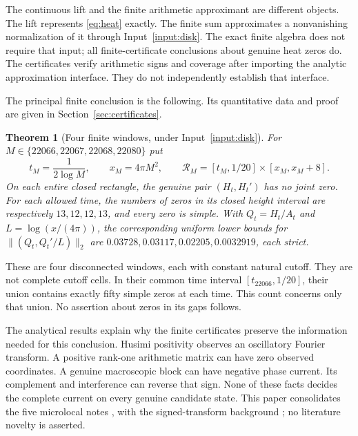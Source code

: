 \documentclass[11pt]{article}
\numberwithin{equation}{section}
\newtheorem{theorem}{Theorem}[section]
\theoremstyle{definition}
\theoremstyle{remark}
\begin{document}
The continuous lift and the finite arithmetic approximant are different
objects. The lift represents \eqref{eq:heat} exactly. The finite sum
approximates a nonvanishing normalization of it through
Input~\ref{input:disk}. The exact finite algebra does not require that
input; all finite-certificate conclusions about genuine heat zeros do. The certificates
verify arithmetic signs and coverage after importing the analytic
approximation interface. They do not independently establish that
interface.

The principal finite conclusion is the following. Its quantitative data
and proof are given in Section~\ref{sec:certificates}.
\begin{theorem}[Four finite windows, under Input~\ref{input:disk}]
\label{thm:main}
For $M\in\{22066,22067,22068,22080\}$ put
\[
 t_M=\frac1{2\log M},\qquad x_M=4\pi M^2,\qquad
 \mathcal R_M=[t_M,1/20]\times[x_M,x_M+8].
\]
On each entire closed rectangle, the genuine pair $(H_t,H_t')$ has no
joint zero. For each allowed time, the numbers of zeros in its closed
height interval are respectively $13,12,12,13$, and every zero is simple.
With $Q_t=H_t/A_t$ and $L=\log(x/(4\pi))$, the corresponding uniform
lower bounds for $\|(Q_t,Q_t'/L)\|_2$ are
$0.03728,0.03117,0.02205,0.0032919$, each strict.
\end{theorem}
These are four disconnected windows, each with constant natural cutoff.
They are not complete cutoff cells. In their common time interval
$[t_{22066},1/20]$, their union contains exactly fifty simple zeros at
each time. This count concerns only that union. No assertion about zeros
in its gaps follows.

The analytical results explain why the finite certificates preserve the
information needed for this conclusion. Husimi positivity observes an
oscillatory Fourier transform. A positive rank-one arithmetic matrix can
have zero observed coordinates. A genuine macroscopic block can have
negative phase current. Its complement and interference can reverse that
sign. None of these facts decides the complete current on every genuine
candidate state. This paper consolidates the five microlocal notes
\cite{micro1,micro2,micro3,micro4,micro5}, with the signed-transform
background \cite{torus,reflection}; no literature novelty is asserted.
\end{document}
